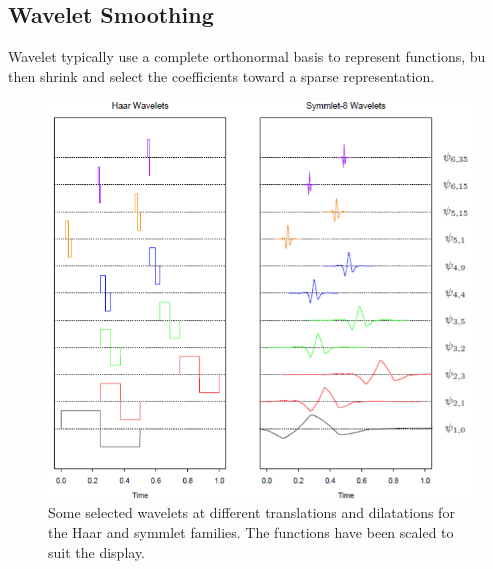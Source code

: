\subsection{Wavelet Smoothing}
Wavelet typically use a complete orthonormal basis to represent functions, bu then shrink and 
select the coefficients toward a sparse representation.
\begin{figure}[H]
	\begin{center}
		\includegraphics[width=\textwidth]{./chap/1chap/3sec/8images/3_wavelet.PNG}
	\end{center}
	\caption{Some selected wavelets at different translations and dilatations for the Haar
	and symmlet families. The functions have been scaled to suit the display.}
	\label{fig: 3_wavelet.PNG}
\end{figure}

